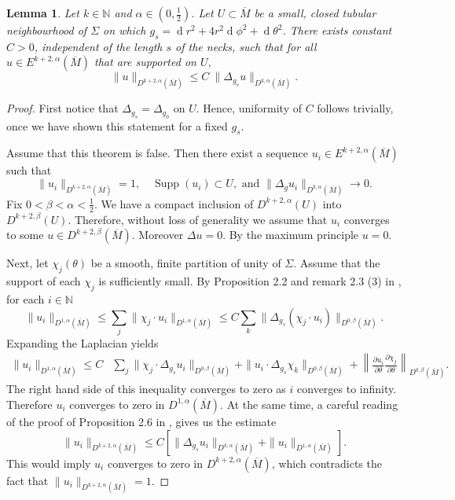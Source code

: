 \documentclass[preprint,12pt]{elsarticle}
\numberwithin{table}{section}
\newtheorem{lemma}{Lemma}[section]
\newcommand{\N}{\mathbb{N}}
\newcommand{\del}{\partial}
\renewcommand{\d}{\operatorname{d}\!}
\begin{document}
\begin{lemma}
	\label{lem:non-uniform-bounded-inverse}
	Let $k \in \N$ and $\alpha \in (0,\frac{1}{2})$.
	Let $U \subset \overline{M}$ be a small, closed tubular neighbourhood of $\Sigma$ on which $g_s = \d r^2 + 4 r^2 \d \phi^2 + \d \theta^2$.
	There exists constant $C > 0$, independent of the length $s$ of the necks, such that for all $u \in E^{k+2, \alpha}(\overline{M})$ that are supported on $U$, 
	$$
	\|u\|_{D^{k+2, \alpha}(\overline{M})} \le C \:
		\| \Delta_{g_s} u\|_{D^{k, \alpha}(\overline{M})}.
	$$
\end{lemma}
\begin{proof}
	First notice that $\Delta_{g_s} = \Delta_{g_0}$ on $U$. Hence, uniformity of $C$ follows trivially, once we have shown this statement for a fixed $g_s$.

	Assume that this theorem is false. Then there exist a sequence $u_i \in E^{k+2, \alpha}(\overline{M})$ such that 
	$$
	\|u_i\|_{D^{k+2,\alpha}(\overline{M})} = 1,\quad \operatorname{Supp}(u_i) \subset U, \text{ and } \|\Delta_{g} u_i\|_{D^{k,\alpha}(\overline{M})} \to 0.
	$$
	Fix $0 < \beta < \alpha < \frac{1}{2}$. We have a compact inclusion of $D^{k+2,\alpha}(U)$ into $D^{k+2,\beta}(U)$. Therefore, without loss of generality we assume that $u_i$ converges to some $u \in D^{k+2,\beta}(\overline{M})$. Moreover $\Delta u = 0$. By the maximum principle $u = 0$.

	Next, let $\chi_j(\theta)$ be a smooth, finite partition of unity of $\Sigma$. Assume that the support of each $\chi_j$ is sufficiently small. By Proposition 2.2 and remark 2.3 (3) in \cite{Donaldson2021}, for each $i\in \N$
	$$
	\|u_i\|_{D^{1, \alpha}(\overline{M})} 
	\le \sum_j \|\chi_j\cdot u_i \|_{D^{1, \alpha}(\overline{M})} 
	\le C \sum_k \|\Delta_{g_s}(\chi_j\cdot u_i)\|_{D^{0, \beta}(\overline{M})}.
	$$
	Expanding the Laplacian yields
	\begin{align}
		\|u_i\|_{D^{1, \alpha}(\overline{M})} 
		\le C&\sum_j 
		\|\chi_j\cdot \Delta_{g_s}u_i\|_{D^{0, \beta}(\overline{M})} +
		\|u_i\cdot \Delta_{g_s}\chi_k\|_{D^{0, \beta}(\overline{M})} + 
		\left\|\frac{\del u_i}{ \del \theta} \frac{\del \chi_j}{\del \theta}\right\|_{D^{0, \beta}(\overline{M})}.
	\end{align}
	The right hand side of this inequality converges to zero as $i$ converges to infinity.
	Therefore $u_i$ converges to zero in $D^{1, \alpha}(\overline{M})$. At the same time, a careful reading of the proof of Proposition 2.6 in \cite{Donaldson2021}, gives us the estimate
	$$
	\|u_i\|_{D^{k+2, \alpha}(\overline{M})} 
		\le C \left[
			\|\Delta_{g_s} u_i\|_{D^{k, \alpha}(\overline{M})} 
			+ \|u_i\|_{D^{1, \alpha}(\overline{M})} 
		\right].
	$$
	This would imply $u_i$ converges to zero in $D^{k+2, \alpha}(\overline{M})$, which contradicts the fact that $\|u_i\|_{D^{k+2,\alpha}(\overline{M})} = 1$.
\end{proof}
\end{document}
